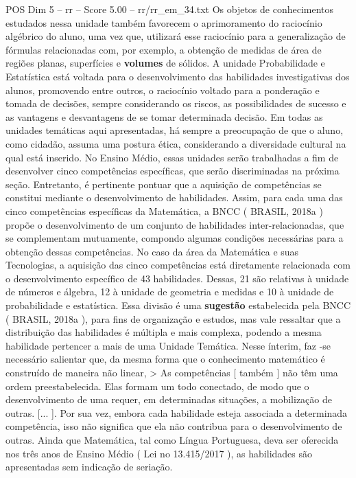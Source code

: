 \begin{textsample}{POS Dim 5 – rr – Score 5.00 – rr/rr\_em\_34.txt}
Os objetos de conhecimentos estudados nessa unidade também favorecem o aprimoramento do raciocínio algébrico do aluno, uma vez que, utilizará esse raciocínio para a generalização de fórmulas relacionadas com, por exemplo, a obtenção de medidas de área de regiões planas, superfícies e \textbf{volumes} de sólidos.
A unidade Probabilidade e Estatística está voltada para o desenvolvimento das habilidades investigativas dos alunos, promovendo entre outros, o raciocínio voltado para a ponderação e tomada de decisões, sempre considerando os riscos, as possibilidades de sucesso e as vantagens e desvantagens de se tomar determinada decisão.
Em todas as unidades temáticas aqui apresentadas, há sempre a preocupação de que o aluno, como cidadão, assuma uma postura ética, considerando a diversidade cultural na qual está inserido.
No Ensino Médio, essas unidades serão trabalhadas a fim de desenvolver cinco competências específicas, que serão discriminadas na próxima seção.
Entretanto, é pertinente pontuar que a aquisição de competências se constitui mediante o desenvolvimento de habilidades.
Assim, para cada uma das cinco competências específicas da Matemática, a BNCC ( BRASIL, 2018a ) propõe o desenvolvimento de um conjunto de habilidades inter-relacionadas, que se complementam mutuamente, compondo algumas condições necessárias para a obtenção dessas competências.
No caso da área da Matemática e suas Tecnologias, a aquisição das cinco competências está diretamente relacionada com o desenvolvimento específico de 43 habilidades.
Dessas, 21 são relativas à unidade de números e álgebra, 12 à unidade de geometria e medidas e 10 à unidade de probabilidade e estatística.
Essa divisão é uma \textbf{sugestão} estabelecida pela BNCC ( BRASIL, 2018a ), para fins de organização e estudos, mas vale ressaltar que a distribuição das habilidades é múltipla e mais complexa, podendo a mesma habilidade pertencer a mais de uma Unidade Temática.
Nesse ínterim, faz -se necessário salientar que, da mesma forma que o conhecimento matemático é construído de maneira não linear, > As competências [ também ] não têm uma ordem preestabelecida.
Elas formam um todo conectado, de modo que o desenvolvimento de uma requer, em determinadas situações, a mobilização de outras. [... ].
Por sua vez, embora cada habilidade esteja associada a determinada competência, isso não significa que ela não contribua para o desenvolvimento de outras.
Ainda que Matemática, tal como Língua Portuguesa, deva ser oferecida nos três anos de Ensino Médio ( Lei no 13.415/2017 ), as habilidades são apresentadas sem indicação de seriação.

\end{textsample}
